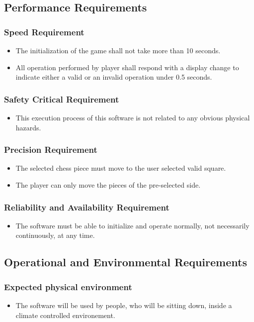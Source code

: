 \documentclass[12pt, titlepage]{article}
\begin{document}
\subsection{Performance Requirements}
\subsubsection{Speed Requirement}
\begin{itemize}
\item The initialization of the game shall not take more than 10 seconds.
\item All operation performed by player shall respond with a display change to indicate either a valid or an invalid operation under 0.5 seconds.
\end{itemize}
\subsubsection{Safety Critical Requirement}
\begin{itemize}
\item This execution process of this software is not related to any obvious physical hazards.
\end{itemize}
\subsubsection{Precision Requirement}
\begin{itemize}
\item The selected chess piece must move to the user selected valid square.
\item The player can only move the pieces of the pre-selected side.
\end{itemize}
\subsubsection{Reliability and Availability Requirement}
\begin{itemize}
\item The software must be able to initialize and operate normally, not necessarily continuously, at any time.
\end{itemize}
\subsection{Operational and Environmental Requirements}
\subsubsection{Expected physical environment}
\begin{itemize}
\item The software will be used by people, who will be sitting down, inside a climate controlled environement.
\end{itemize}
\end{document}
